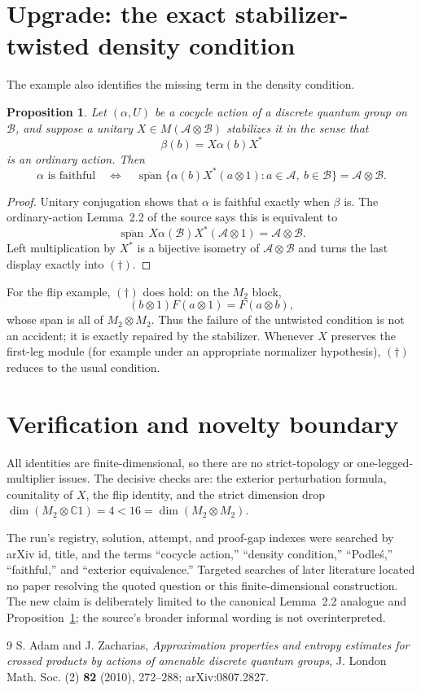 \documentclass[11pt]{article}
\newtheorem{proposition}{Proposition}
\newcommand{\A}{\mathcal A}
\newcommand{\B}{\mathcal B}
\newcommand{\spn}{\operatorname{span}}
\begin{document}
\section{Upgrade: the exact stabilizer-twisted density condition}

The example also identifies the missing term in the density condition.

\begin{proposition}\label{prop:corrected}
Let $(\alpha,U)$ be a cocycle action of a discrete quantum group on $\B$,
and suppose a unitary $X\in M(\A\otimes\B)$ stabilizes it in the sense that
\[
 \beta(b)=X\alpha(b)X^*
\]
is an ordinary action.  Then
\[
 \alpha\text{ is faithful}
 \quad\Longleftrightarrow\quad
 \overline{\spn}\{\alpha(b)X^*(a\otimes1):
                   a\in\A,\ b\in\B\}=\A\otimes\B.
 \tag{$\dagger$}
\]
\end{proposition}

\begin{proof}
Unitary conjugation shows that $\alpha$ is faithful exactly when $\beta$ is.
The ordinary-action Lemma~2.2 of the source says this is equivalent to
\[
 \overline{\spn}\,X\alpha(\B)X^*(\A\otimes1)=\A\otimes\B.
\]
Left multiplication by $X^*$ is a bijective isometry of $\A\otimes\B$ and
turns the last display exactly into $(\dagger)$.
\end{proof}

For the flip example, $(\dagger)$ does hold: on the $M_2$ block,
\[
 (b\otimes1)F(a\otimes1)=F(a\otimes b),
\]
whose span is all of $M_2\otimes M_2$.  Thus the failure of the untwisted
condition is not an accident; it is exactly repaired by the stabilizer.
Whenever $X$ preserves the first-leg module (for example under an appropriate
normalizer hypothesis), $(\dagger)$ reduces to the usual condition.

\section{Verification and novelty boundary}

All identities are finite-dimensional, so there are no strict-topology or
one-legged-multiplier issues.  The decisive checks are: the exterior
perturbation formula, counitality of $X$, the flip identity, and the strict
dimension drop
$\dim(M_2\otimes\mathbb C1)=4<16=\dim(M_2\otimes M_2)$.

The run's registry, solution, attempt, and proof-gap indexes were searched by
arXiv id, title, and the terms ``cocycle action,'' ``density condition,''
``Podle\'s,'' ``faithful,'' and ``exterior equivalence.''  Targeted searches
of later literature located no paper resolving the quoted question or this
finite-dimensional construction.  The new claim is deliberately limited to
the canonical Lemma~2.2 analogue and Proposition~\ref{prop:corrected}; the
source's broader informal wording is not overinterpreted.

\begin{thebibliography}{9}
S. Adam and J. Zacharias,
\emph{Approximation properties and entropy estimates for crossed products by
actions of amenable discrete quantum groups},
J. London Math. Soc. (2) \textbf{82} (2010), 272--288;
arXiv:0807.2827.
\end{thebibliography}
\end{document}
